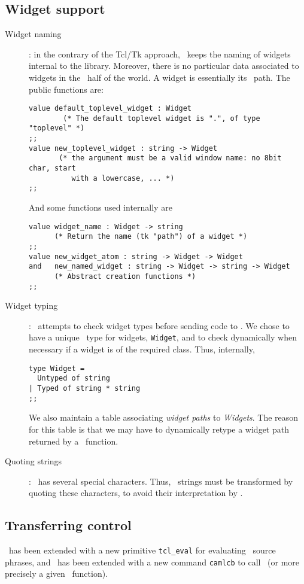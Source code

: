\subsection{Widget support}
\begin{description}
\item[Widget naming] :
in the contrary of the {\sf Tcl/Tk} approach, \camltk\ keeps the naming of
widgets internal to the library. Moreover, there is no particular data
associated to widgets in the \caml\ half of the world. A widget is
essentially its \tk\ path. The public functions are: 

\begin{verbatim}
value default_toplevel_widget : Widget
      	(* The default toplevel widget is ".", of type "toplevel" *)
;;
value new_toplevel_widget : string -> Widget
       (* the argument must be a valid window name: no 8bit char, start
          with a lowercase, ... *)
;;
\end{verbatim} 
And some functions used internally are
\begin{verbatim}
value widget_name : Widget -> string
      (* Return the name (tk "path") of a widget *)
;;
value new_widget_atom : string -> Widget -> Widget
and   new_named_widget : string -> Widget -> string -> Widget
      (* Abstract creation functions *)
;;
\end{verbatim} 

\item[Widget typing] :
\camltk\ attempts to check widget types before sending code to \tcl.
We chose to have a unique \caml\ type for widgets, \verb|Widget|, and
to check dynamically when necessary if a widget is of the required class.
Thus, internally, 
\begin{verbatim}
type Widget =
  Untyped of string
| Typed of string * string
;;
\end{verbatim} 
We also maintain a table associating {\em widget paths} to {\em Widgets}.
The reason for this table is that we may have to dynamically retype a widget
path returned by a \tcl\ function.

\item[Quoting strings] :
\tcl\ has several special characters. Thus, \caml\ strings must be
transformed by quoting these characters, to avoid their interpretation by
\tcl.
\end{description}


\subsection{Transferring control}
\caml\ has been extended with a new primitive \verb|tcl_eval| for evaluating
\tcl\ source phrases, and \tcl\ has been extended with a new command
\verb|camlcb| to call \caml\ (or more precisely a given \caml\ function).

